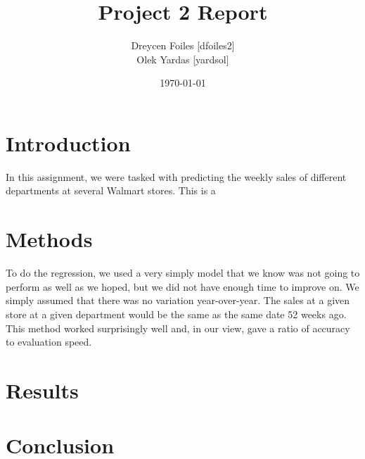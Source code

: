\documentclass{article}
\title{Project 2 Report}
\author{Dreycen Foiles [dfoiles2] \\ Olek Yardas [yardsol]}
\date{\today}
\begin{document}
\maketitle

\section{Introduction}
In this assignment, we were tasked with predicting the weekly sales of different departments at several Walmart stores. This is a 

\section{Methods}
To do the regression, we used a very simply model that we know was not going to perform as well as we hoped, but we did not have enough time to improve on. We simply assumed that there was no variation year-over-year. The sales at a given store at a given department would be the same as the same date 52 weeks ago. This method worked surprisingly well and, in our view, gave a ratio of accuracy to evaluation speed. 

\section{Results}

\section{Conclusion}
\end{document}
